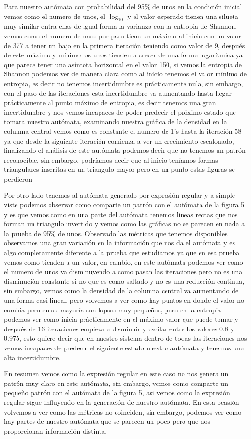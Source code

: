 \documentclass[11pt]{article}
\begin{document}
		 Para nuestro autómata con probabilidad del 95\% de unos en la condición inicial vemos como el numero de unos, el $\log_{10}$ y el valor esperado tienen una silueta muy similar entra ellas de igual forma la varianza con la entropia de Shannon, vemos como el numero de unos por paso tiene un máximo al inicio con un valor de 377 a tener un bajo en la primera iteración teniendo como valor de 9, después de este máximo y mínimo los unos tienden a crecer de una forma logarítmica ya que parece tener una asíntota horizontal en el valor 150, si vemos la entropia de Shannon podemos ver de manera clara como al inicio tenemos el valor mínimo de entropia, es decir no tenemos incertidumbre es prácticamente nula, sin embargo, con el paso de las iteraciones esta incertidumbre va aumentando hasta llegar prácticamente al punto máximo de entropia, es decir tenemos una gran incertidumbre y nos vemos incapaces de poder predecir el próximo estado que tomara nuestro autómata, examinando nuestra gráfica de la densidad en la columna central vemos como es constante el numero de 1's hasta la iteración 58 ya que desde la siguiente iteración comienza a ver un crecimiento escalonado, finalizando el análisis de este autómata podemos decir que no tenemos un patrón reconocible, sin embargo, podríamos decir que al inicio teníamos formas triangulares inscritas en un triangulo mayor pero en un punto estas figuras se perdieron.\par
		 Por otro lado tenemos al autómata generado por expresión regular y a simple viste podemos observar como comparte un patrón con el autómata de la figura 5 y es que vemos como en una parte del autómata tenemos lineas rectas que nos forman un triangulo invertido y vemos como las gráficas no se parecen en nada a la prueba de 95\% de unos. Observado las métricas que tenemos disponibles observamos una gran variación en la información que nos da el autómata y es algo completamente diferente a la prueba que estudiamos ya que en esa prueba vemos como tienden a un valor, en cambio, en este autómata podemos ver como el numero de unos va disminuyendo a como pasan las iteraciones pero no es una disminución constante si no que es como saltado y no es una reducción continua, sin embargo, vemos como la densidad de la columna central va aumentando de una forma casi lineal, pero volvemos a ver como hay puntos en donde el valor no cambia pero en su mayoría son lapsos muy pequeños, pero en la entropia podemos ver como inicia prácticamente en el máximo valor que puede tomar y después de 16 iteraciones empieza a disminuir y oscilar entre los valores 0.8 y 0.975, esto quiere decir que en nuestro sistema dentro de todas las iteraciones nos vemos incapaces de predecir el siguiente estado nuestro autómata y tenemos una alta incertidumbre.\par
		 En resumen vemos como la expresión regular en este caso no nos genera un patrón muy claro en este autómata, sin embargo, vemos como comparte un pequeño patrón con el autómata de la figura 5, asi vemos como la expresión regular sigue influyendo en la generación de nuestro autómata. En esta ocasión volvemos a ver como las métricas no coinciden, sin embargo, podemos ver como hay partes de nuestro autómata que se parecen un poco pero que nos proporcionan información distinta.\newpage
\end{document}
